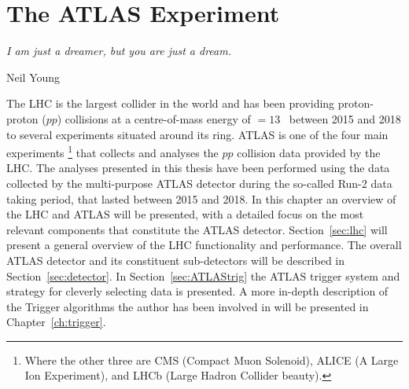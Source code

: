 \chapter{The ATLAS Experiment}
\label{ch:detector}
\epigraph{\emph{I am just a dreamer, but you are just a dream.}}{Neil Young}
\newcommand{\pileup}{
\begin{figure}[!hbt]
\begin{center}
\subbottom[Run-1 (2011-2012)]{\texttt{[image: Detector/LHC/mu\_2011\_2012-dec]}}
\subbottom[Run-2 (2015-2018)]{\texttt{[image: Detector/LHC/mu\_2015\_2017]}}
\end{center}
\setlength{\belowcaptionskip}{-20pt}
\caption{Luminosity-weighted mean number of interaction per crossing in the \ac{ATLAS} detector during stable beams for $pp$ collisions at centre-of-mass energy of 13 \tev for (a) Run-1 (2011-2012) and (b) Run-2 (2015-2018) data collection periods.}
\label{fig:pileup}
\end{figure}
}

\newcommand{\injectionChain}{
\begin{figure}[!hbt]
\centering
\texttt{[image: Detector/LHC/injector\_schematics]}
\setlength{\belowcaptionskip}{-20pt}
\caption{Schematics of \ac{CERN} accelerator complex. The \ac{LHC} is represented by the larger gray oval line, with the smaller machines used for early-stage accleration and to provide beams for other experiments shown in different colors~\cite{Lefevre2008}.}
\label{fig:injectionchain}
\end{figure}
}
	The \ac{LHC} is the largest collider in the world and has been providing proton-proton ($pp$) collisions at a centre-of-mass energy of \com$=13$ \tev\ between 2015 and 2018 to several experiments situated around its ring. \ac{ATLAS} is one of the four main experiments
	\footnote{Where the other three are CMS (Compact Muon Solenoid), ALICE (A Large Ion Experiment), and LHCb (Large Hadron Collider beauty).}
	 that collects and analyses the $pp$ collision data provided by the \ac{LHC}.
	The analyses presented in this thesis have been performed using the data collected by the multi-purpose \ac{ATLAS} detector during the so-called Run-2 data taking period, that lasted between 2015 and 2018.	
	In this chapter an overview of the \ac{LHC} and \ac{ATLAS} will be presented, with a detailed focus on the most relevant components  that constitute the \ac{ATLAS} detector. 
	Section~\ref{sec:lhc} will present a general overview of the \ac{LHC} functionality and performance. 
	The overall \ac{ATLAS} detector and its constituent sub-detectors will be described in Section~\ref{sec:detector}. In Section~\ref{sec:ATLAStrig} the \ac{ATLAS} trigger system and strategy for cleverly selecting data is presented. 
	A more in-depth description of the Trigger algorithms the author has been involved in will be presented in Chapter~\ref{ch:trigger}.
